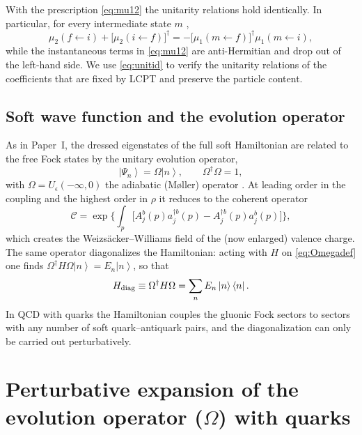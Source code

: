 \documentclass[11pt,a4paper]{article}
\numberwithin{equation}{section}
\newcommand{\dg}{\dagger}
\newcommand{\ket}[1]{\left|#1\right\rangle}
\newcommand{\bra}[1]{\left\langle#1\right|}
\newcommand{\OM}{\Omega}
\begin{document}
With the prescription \eqref{eq:mu12} the unitarity relations hold identically. In particular,
for every intermediate state $m$ \cite{PaperI},
\begin{equation}
\mu_{2}(f\leftarrow i)+\big[\mu_{2}(i\leftarrow f)\big]^{\dg}
=-\big[\mu_{1}(m\leftarrow f)\big]^{\dg}\mu_{1}(m\leftarrow i),
\label{eq:unitid}
\end{equation}
while the instantaneous terms in \eqref{eq:mu12} are anti-Hermitian and drop out of the left-hand
side. We use \eqref{eq:unitid} to verify the unitarity relations of the coefficients that are
fixed by LCPT and preserve the particle content.

\subsection{Soft wave function and the evolution operator}
\label{sec:omegadef}

As in Paper~I, the dressed eigenstates of the full soft Hamiltonian are related to the free Fock
states by the unitary evolution operator,
\begin{equation}
\ket{\Psi_{n}}=\OM\ket{n},\qquad \OM^{\dg}\OM=1,
\label{eq:Omegadef}
\end{equation}
with $\OM=U_{\epsilon}(-\infty,0)$ the adiabatic (M{\o}ller) operator \cite{Kovner:2018fxj}. At
leading order in the coupling and the highest order in $\rho$ it reduces to the coherent operator
\begin{equation}
\mathcal C=\exp\Big\{\int_{p}\Big[A^{b}_{j}(p)a^{\dg b}_{j}(p)-A^{\dg b}_{j}(p)a^{b}_{j}(p)\Big]\Big\},
\label{eq:coherent}
\end{equation}
which creates the Weizs\"acker--Williams field of the (now enlarged) valence charge. The same
operator diagonalizes the Hamiltonian: acting with $H$ on \eqref{eq:Omegadef} one finds
$\OM^{\dg}H\OM\ket{n}=E_{n}\ket{n}$, so that
\begin{equation}
H_{\rm diag}\equiv\OM^{\dg}H\OM=\sum_{n}E_{n}\ket{n}\bra{n}.
\label{eq:Hdiag}
\end{equation}
In QCD with quarks the Hamiltonian couples the gluonic Fock sectors to sectors with any number of
soft quark--antiquark pairs, and the diagonalization can only be carried out perturbatively.

\section{Perturbative expansion of the evolution operator ($\OM$) with quarks}
\label{sec:omega}
\end{document}
